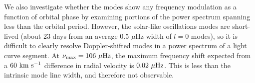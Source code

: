 We also investigate whether the modes show any frequency modulation as a function of orbital phase by examining portions of the power spectrum spanning less than the orbital period. However, the solar-like oscillations modes are short-lived (about 23 days from an average 0.5 $\mu$Hz width of $l=0$ modes), so it is difficult to clearly resolve Doppler-shifted modes in a power spectrum of a light curve segment. At $\nu_{\rm{max}} = 106 \ \mu \rm{Hz}$, the maximum frequency shift expected from a $60 \ \rm{km} \ \rm{s}^{-1}$ difference in radial velocity is $0.02 \ \mu \rm{Hz}$. This is less than the intrinsic mode line width, and therefore not observable.

  
  
  